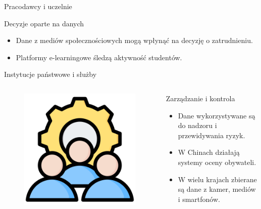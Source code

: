     
    \begin{frame}{Pracodawcy i uczelnie}
    \begin{alertblock}{Decyzje oparte na danych}
        \begin{itemize}
          \item Dane z mediów społecznościowych mogą wpłynąć na decyzję o zatrudnieniu.\cite{DIGITAL_GLOBAL}
          \item Platformy e-learningowe śledzą aktywność studentów.
        \end{itemize}
    \end{alertblock}
    \end{frame}
    
    
    \begin{frame}{Instytucje państwowe i służby}
    \begin{columns}[c]
        \begin{figure}
          \centering
          \includegraphics[height=0.45\textheight]{images/user-management.png}
        \end{figure}
        \begin{alertblock}{Zarządzanie i kontrola}
            \begin{itemize}
              \item Dane wykorzystywane są do nadzoru i przewidywania ryzyk.
              \item W Chinach działają systemy oceny obywateli.\cite{DIGITAL_LOCAL}
              \item W wielu krajach zbierane są dane z kamer, mediów i smartfonów.
            \end{itemize}
        \end{alertblock}
    \end{columns}
    \end{frame}
    
